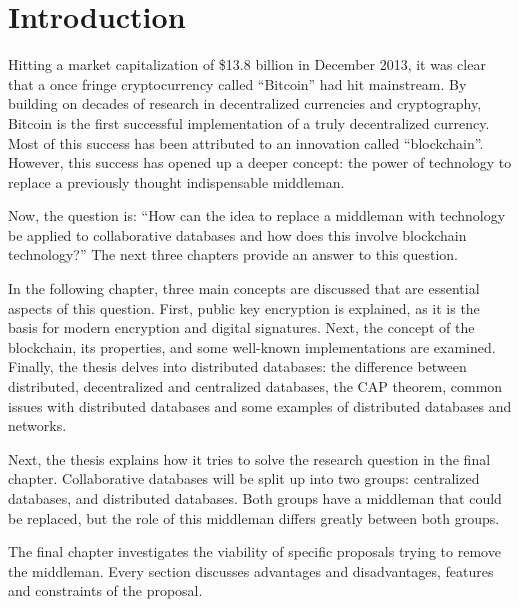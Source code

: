 \chapter{Introduction}


Hitting a market capitalization of \$13.8 billion in December 2013, it was clear that a once fringe cryptocurrency called ``Bitcoin'' had hit mainstream. By building on decades of research in decentralized currencies and cryptography, Bitcoin is the first successful implementation of a truly decentralized currency. Most of this success has been attributed to an innovation called ``blockchain''. However, this success has opened up a deeper concept: the power of technology to replace a previously thought indispensable middleman.


Now, the question is: ``How can the idea to replace a middleman with technology be applied to collaborative databases and how does this involve blockchain technology?'' The next three chapters provide an answer to this question.


In the following chapter, three main concepts are discussed that are essential aspects of this question. First, public key encryption is explained, as it is the basis for modern encryption and digital signatures. Next, the concept of the blockchain, its properties, and some well-known implementations are examined. Finally, the thesis delves into distributed databases: the difference between distributed, decentralized and centralized databases, the CAP theorem, common issues with distributed databases and some examples of distributed databases and networks.

Next, the thesis explains how it tries to solve the research question in the final chapter. Collaborative databases will be split up into two groups: centralized databases, and distributed databases. Both groups have a middleman that could be replaced, but the role of this middleman differs greatly between both groups. 

The final chapter investigates the viability of specific proposals trying to remove the middleman. Every section discusses advantages and disadvantages, features and constraints of the proposal.
